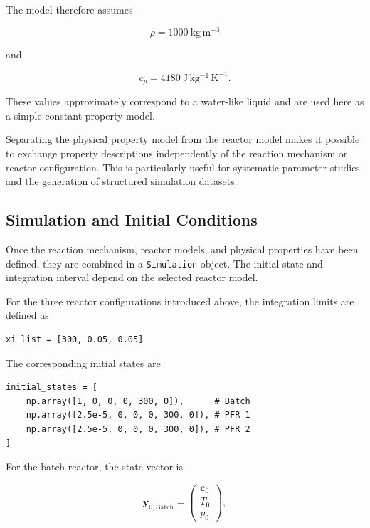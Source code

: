 The model therefore assumes

\begin{equation}
    \rho = 1000~\mathrm{kg\,m^{-3}}
\end{equation}

and

\begin{equation}
    c_p = 4180~\mathrm{J\,kg^{-1}\,K^{-1}}.
\end{equation}

These values approximately correspond to a water-like liquid and are used here
as a simple constant-property model.

Separating the physical property model from the reactor model makes it possible
to exchange property descriptions independently of the reaction mechanism or
reactor configuration. This is particularly useful for systematic parameter
studies and the generation of structured simulation datasets.


\subsection{Simulation and Initial Conditions}

Once the reaction mechanism, reactor models, and physical properties have been
defined, they are combined in a \texttt{Simulation} object. The initial state
and integration interval depend on the selected reactor model.

For the three reactor configurations introduced above, the integration limits
are defined as

\begin{verbatim}
xi_list = [300, 0.05, 0.05]
\end{verbatim}

The corresponding initial states are

\begin{verbatim}
initial_states = [
    np.array([1, 0, 0, 0, 300, 0]),      # Batch
    np.array([2.5e-5, 0, 0, 0, 300, 0]), # PFR 1
    np.array([2.5e-5, 0, 0, 0, 300, 0]), # PFR 2
]
\end{verbatim}

For the batch reactor, the state vector is

\begin{equation}
    \mathbf{y}_{0,\mathrm{Batch}}
    =
    \begin{pmatrix}
        \mathbf{c}_0 \\
        T_0 \\
        p_0
    \end{pmatrix},
\end{equation}

